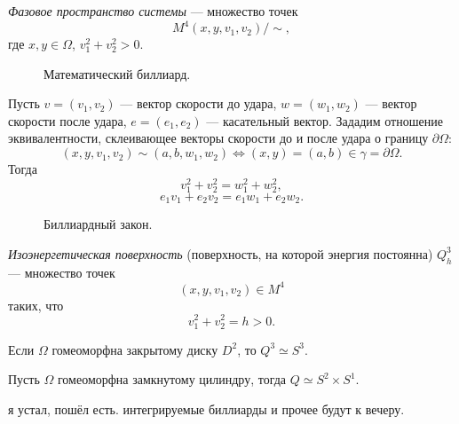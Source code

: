 \begin{definition}
    \textit{Фазовое пространство системы} — множество точек 
    $$M^4(x,y,v_1,v_2) / \sim,$$
    где $x,y \in \Omega$, $v_1^2+v_2^2 > 0.$
\end{definition} 

\begin{figure}[ht]
    \centering
    \caption{Математический биллиард.}
    \label{fig:c15.1}
\end{figure}


Пусть $v = (v_1,v_2)$ — вектор скорости до удара, $w = (w_1,w_2)$ — вектор скорости после удара, $e = (e_1,e_2)$ — касательный вектор. Зададим отношение эквивалентности, склеивающее векторы скорости до и после удара о границу $\partial \Omega$:
\[(x,y,v_1,v_2) \sim (a,b,w_1,w_2) \Longleftrightarrow (x,y) = (a,b) \in \gamma = \partial \Omega.\]
Тогда
\[v_1^2 + v_2^2 = w_1^2 + w_2^2,\]
\[e_1v_1 + e_2v_2 = e_1w_1 + e_2w_2.\]
\begin{figure}[ht]
    \centering
    \caption{Биллиардный закон.}
    \label{fig:c15.2}
\end{figure}

\begin{definition}
    \textit{Изоэнергетическая поверхность} (поверхность, на которой энергия постоянна) $Q_h^3$ — множество точек 
    \[(x,y,v_1,v_2) \in M^4\]
    таких, что 
    \[v_1^2+v_2^2 = h > 0.\]
\end{definition} 

\begin{statement}
    Если $\Omega$ гомеоморфна закрытому диску $D^2$, то $Q^3 \simeq S^3$.
\end{statement} 

\begin{statement}
    Пусть $\Omega$ гомеоморфна замкнутому цилиндру, тогда $Q \simeq S^2 \times S^1$.
\end{statement} 

я устал, пошёл есть. интегрируемые биллиарды и прочее будут к вечеру.